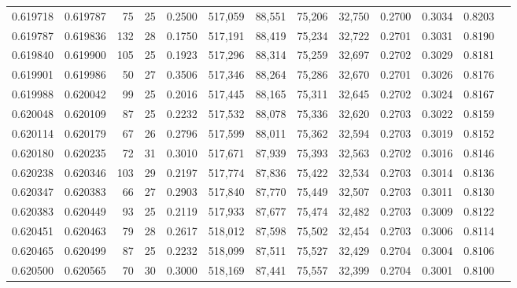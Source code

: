 \begin{tabular}{rrrrrrrrrrrrr}
0.619718 & 0.619787 &  75 &  25 &                                     0.2500 & 517,059 &  88,551 &  75,206 &  32,750 & 0.2700 & 0.3034 & 0.8203 \\
0.619787 & 0.619836 & 132 &  28 &                                     0.1750 & 517,191 &  88,419 &  75,234 &  32,722 & 0.2701 & 0.3031 & 0.8190 \\
0.619840 & 0.619900 & 105 &  25 &                                     0.1923 & 517,296 &  88,314 &  75,259 &  32,697 & 0.2702 & 0.3029 & 0.8181 \\
0.619901 & 0.619986 &  50 &  27 &                                     0.3506 & 517,346 &  88,264 &  75,286 &  32,670 & 0.2701 & 0.3026 & 0.8176 \\
0.619988 & 0.620042 &  99 &  25 &                                     0.2016 & 517,445 &  88,165 &  75,311 &  32,645 & 0.2702 & 0.3024 & 0.8167 \\
0.620048 & 0.620109 &  87 &  25 &                                     0.2232 & 517,532 &  88,078 &  75,336 &  32,620 & 0.2703 & 0.3022 & 0.8159 \\
0.620114 & 0.620179 &  67 &  26 &                                     0.2796 & 517,599 &  88,011 &  75,362 &  32,594 & 0.2703 & 0.3019 & 0.8152 \\
0.620180 & 0.620235 &  72 &  31 &                                     0.3010 & 517,671 &  87,939 &  75,393 &  32,563 & 0.2702 & 0.3016 & 0.8146 \\
0.620238 & 0.620346 & 103 &  29 &                                     0.2197 & 517,774 &  87,836 &  75,422 &  32,534 & 0.2703 & 0.3014 & 0.8136 \\
0.620347 & 0.620383 &  66 &  27 &                                     0.2903 & 517,840 &  87,770 &  75,449 &  32,507 & 0.2703 & 0.3011 & 0.8130 \\
0.620383 & 0.620449 &  93 &  25 &                                     0.2119 & 517,933 &  87,677 &  75,474 &  32,482 & 0.2703 & 0.3009 & 0.8122 \\
0.620451 & 0.620463 &  79 &  28 &                                     0.2617 & 518,012 &  87,598 &  75,502 &  32,454 & 0.2703 & 0.3006 & 0.8114 \\
0.620465 & 0.620499 &  87 &  25 &                                     0.2232 & 518,099 &  87,511 &  75,527 &  32,429 & 0.2704 & 0.3004 & 0.8106 \\
0.620500 & 0.620565 &  70 &  30 &                                     0.3000 & 518,169 &  87,441 &  75,557 &  32,399 & 0.2704 & 0.3001 & 0.8100 \\

\end{tabular}

